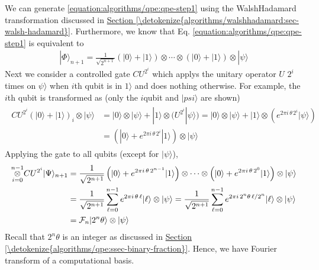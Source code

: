 \documentclass[letterpaper,10pt,english]{jupyterBook}
\begin{document}
\sphinxAtStartPar
We can generate \eqref{equation:algorithms/qpe:qpe-step1} using the Walsh\sphinxhyphen{}Hadamard transformation discussed in \hyperref[\detokenize{algorithms/walshhadamard:sec-walsh-hadamard}]{Section \ref{\detokenize{algorithms/walshhadamard:sec-walsh-hadamard}}}.  Furthermore, we know that Eq. \eqref{equation:algorithms/qpe:qpe-step1} is equivalent to
\begin{equation*}
\begin{split}
|\Phi\rangle_{n+1} = \frac{1}{\sqrt{2^{n+1}}} \left(|0\rangle + |1\rangle\right) \otimes \cdots \otimes \left(|0\rangle + |1\rangle\right) \otimes |\psi\rangle
\end{split}
\end{equation*}
\sphinxAtStartPar
Next we consider a controlled gate \(CU^{2^i}\) which applys the unitary operator \(U\) \(2^i\) times on \(\psi\rangle\) when \(i\)\sphinxhyphen{}th qubit is in \(1\rangle\) and does nothing otherwise.  For example, the \(i\)\sphinxhyphen{}th qubit is transformed as (only the \(i\)\sphinxhyphen{}qubit and \(|psi\rangle\) are shown)
\begin{equation*}
\begin{split}
\begin{align}
CU^{2^i} \left(|0\rangle + |1\rangle\right)_i \otimes |\psi\rangle &=
|0\rangle \otimes |\psi\rangle + |1\rangle \otimes (U^{2^i}|\psi\rangle)
= |0\rangle \otimes |\psi\rangle + |1\rangle \otimes (e^{2\pi i\, \theta\, 2^i} |\psi\rangle) \\
&= \left(|0\rangle + e^{2\pi i\, \theta\, 2^i} |1\rangle\right) \otimes |\psi\rangle
\end{align}
\end{split}
\end{equation*}
\sphinxAtStartPar
Applying the gate to all qubits (except for \(|\psi\rangle\)),
\begin{equation*}
\begin{split}
\begin{align}
\overset{n-1}{\underset{i=0}{\Large\otimes}} CU^{2^i} |\Psi\rangle_{n+1}
&= \frac{1}{\sqrt{2^{n+1}}} \left(|0\rangle + e^{2\pi i\, \theta\,2^{n-1}}|1\rangle\right) \otimes \cdots \otimes \left(|0\rangle + e^{2\pi i\, \theta\,2^{0}}|1\rangle\right) \otimes |\psi\rangle \\
& =  \frac{1}{\sqrt{2^{n+1}}} \sum_{\ell=0}^{n-1} e^{2\pi i\, \theta\, \ell} |\ell\rangle \otimes |\psi\rangle =  \frac{1}{\sqrt{2^{n+1}}} \sum_{\ell=0}^{n-1} e^{2\pi i\, 2^n \theta\, \ell/2^n} |\ell\rangle \otimes |\psi\rangle \\
&= \mathcal{F}_{n} |2^n \theta\rangle \otimes |\psi\rangle
\end{align}
\end{split}
\end{equation*}
\sphinxAtStartPar
Recall that \(2^n \theta\) is an integer as discussed in \hyperref[\detokenize{algorithms/qpe:ssec-binary-fraction}]{Section \ref{\detokenize{algorithms/qpe:ssec-binary-fraction}}}.  Hence, we have Fourier transform of a computational basis.
\end{document}
